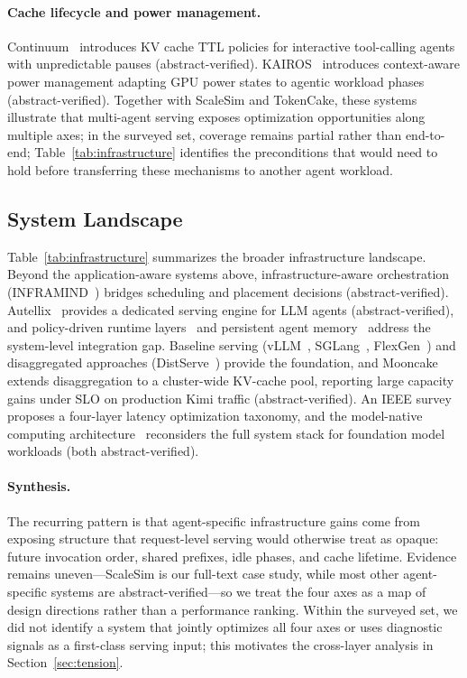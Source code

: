 \paragraph*{Cache lifecycle and power management.}
Continuum~\cite{continuum2025} introduces KV cache TTL policies for interactive tool-calling agents with unpredictable pauses (abstract-verified). KAIROS~\cite{kairos2026} introduces context-aware power management adapting GPU power states to agentic workload phases (abstract-verified). Together with ScaleSim and TokenCake, these systems illustrate that multi-agent serving exposes optimization opportunities along multiple axes; in the surveyed set, coverage remains partial rather than end-to-end; Table~\ref{tab:infrastructure} identifies the preconditions that would need to hold before transferring these mechanisms to another agent workload.

\subsection{System Landscape}\label{sec:infra_landscape}

Table~\ref{tab:infrastructure} summarizes the broader infrastructure landscape. Beyond the application-aware systems above, infrastructure-aware orchestration (INFRAMIND~\cite{inframind2026}) bridges scheduling and placement decisions (abstract-verified). Autellix~\cite{autellix2025} provides a dedicated serving engine for LLM agents (abstract-verified), and policy-driven runtime layers~\cite{policyruntime2026} and persistent agent memory~\cite{agentmemory2026} address the system-level integration gap. Baseline serving (vLLM~\cite{kwon2023}, SGLang~\cite{sglang2024}, FlexGen~\cite{flexgen2023}) and disaggregated approaches (DistServe~\cite{distserve2024}) provide the foundation, and Mooncake~\cite{mooncake2025} extends disaggregation to a cluster-wide KV-cache pool, reporting large capacity gains under SLO on production Kimi traffic (abstract-verified). An IEEE survey~\cite{latencysurvey2026} proposes a four-layer latency optimization taxonomy, and the model-native computing architecture~\cite{modelnative2026} reconsiders the full system stack for foundation model workloads (both abstract-verified).

\paragraph*{Synthesis.} The recurring pattern is that agent-specific infrastructure gains come from exposing structure that request-level serving would otherwise treat as opaque: future invocation order, shared prefixes, idle phases, and cache lifetime. Evidence remains uneven---ScaleSim is our full-text case study, while most other agent-specific systems are abstract-verified---so we treat the four axes as a map of design directions rather than a performance ranking. Within the surveyed set, we did not identify a system that jointly optimizes all four axes or uses diagnostic signals as a first-class serving input; this motivates the cross-layer analysis in Section~\ref{sec:tension}.

